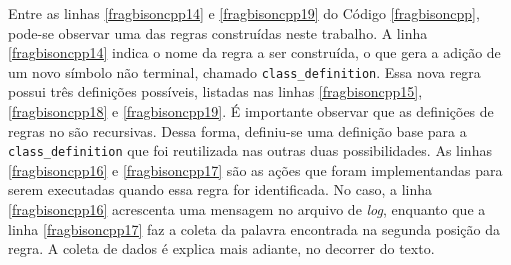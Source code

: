 Entre as linhas \ref{fragbisoncpp14} e \ref{fragbisoncpp19} do Código
\ref{fragbisoncpp}, pode-se observar uma das regras construídas neste trabalho.
A linha \ref{fragbisoncpp14} indica o nome da regra a ser construída, o que
gera a adição de um novo símbolo não terminal, chamado
\lstinline|class_definition|. Essa nova regra possui três definições possíveis,
listadas nas linhas \ref{fragbisoncpp15}, \ref{fragbisoncpp18} e
\ref{fragbisoncpp19}. É importante observar que as definições de regras no
\bisoncpp são recursivas. Dessa forma, definiu-se uma definição base para a
\lstinline|class_definition| que foi reutilizada nas outras duas possibilidades.
As linhas \ref{fragbisoncpp16} e \ref{fragbisoncpp17} são as ações que foram
implementandas para serem executadas quando essa regra for identificada.
No caso, a linha \ref{fragbisoncpp16} acrescenta uma mensagem no arquivo de
\textit{log}, enquanto que a linha \ref{fragbisoncpp17} faz a coleta da
palavra encontrada na segunda posição da regra. A coleta de dados é explica mais
adiante, no decorrer do texto.





